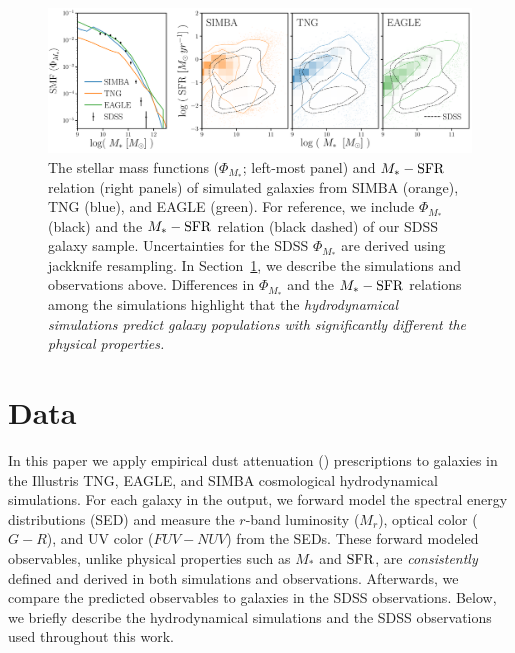 \begin{figure}
\begin{center}
    \includegraphics[width=\textwidth]{figs/smf_m_sfr.pdf}
    \caption{\label{fig:smf_msfr}
    The stellar mass functions ($\Phi_{M_*}$; left-most panel) and $M_*-{\rm SFR}$
    relation (right panels) of simulated galaxies from SIMBA (orange), TNG
    (blue), and EAGLE (green). For reference, we include $\Phi_{M_*}$ (black)
    and the $M_*-{\rm SFR}$ relation (black dashed) of our SDSS galaxy sample. 
    Uncertainties for the SDSS $\Phi_{M_*}$ are derived using jackknife resampling. 
    In Section~\ref{sec:sims}, we describe the simulations and observations above.
    Differences in $\Phi_{M_*}$ and the $M_*-{\rm SFR}$ relations among the
    simulations highlight that the \emph{hydrodynamical simulations predict
    galaxy populations with significantly different the physical properties.} 
    }
\end{center}
\end{figure}

\section{Data}\label{sec:sims}
In this paper we apply empirical dust attenuation (\eda) prescriptions to galaxies 
in the Illustris TNG, EAGLE, and SIMBA cosmological hydrodynamical simulations. 
For each galaxy in the \eda output, we forward model the spectral energy distributions 
(SED) and measure the $r$-band luminosity ($M_r$), optical color ($G-R$), and
UV color ($FUV-NUV$) from the SEDs. These forward modeled observables, unlike
physical properties such as $M_*$ and ${\rm SFR}$, are \emph{consistently} defined
and derived in both simulations and observations. Afterwards, we compare the
predicted \eda observables to galaxies in the SDSS observations. Below, we
briefly describe the hydrodynamical simulations and the SDSS observations used
throughout this work.

